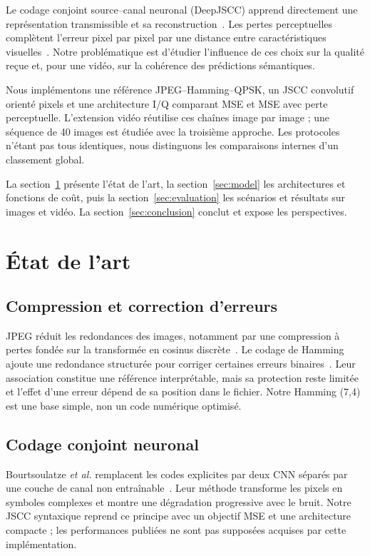 \documentclass[conference]{IEEEtran}
\begin{document}
Le codage conjoint source--canal neuronal (DeepJSCC) apprend directement
une représentation transmissible et sa reconstruction~\cite{deepjscc}.
Les pertes perceptuelles complètent l'erreur pixel par pixel par une
distance entre caractéristiques visuelles~\cite{perceptual}. Notre
problématique est d'étudier l'influence de ces choix sur la qualité
reçue et, pour une vidéo, sur la cohérence des prédictions sémantiques.

Nous implémentons une référence JPEG--Hamming--QPSK, un JSCC
convolutif orienté pixels et une architecture I/Q comparant MSE et
MSE avec perte perceptuelle. L'extension vidéo réutilise ces chaînes
image par image ; une séquence de 40 images est étudiée avec la
troisième approche. Les protocoles n'étant pas tous identiques,
nous distinguons les comparaisons internes d'un classement global.

La section~\ref{sec:related} présente l'état de l'art, la
section~\ref{sec:model} les architectures et fonctions de coût, puis
la section~\ref{sec:evaluation} les scénarios et résultats sur images
et vidéo. La section~\ref{sec:conclusion} conclut et expose les perspectives.

\section{État de l'art}
\label{sec:related}
\subsection{Compression et correction d'erreurs}
JPEG réduit les redondances des images, notamment par une compression
à pertes fondée sur la transformée en cosinus discrète~\cite{jpeg}.
Le codage de Hamming ajoute une redondance structurée pour corriger
certaines erreurs binaires~\cite{hamming}. Leur association constitue
une référence interprétable, mais sa protection reste limitée et
l'effet d'une erreur dépend de sa position dans le fichier. Notre
Hamming (7,4) est une base simple, non un code numérique optimisé.

\subsection{Codage conjoint neuronal}
Bourtsoulatze \textit{et al.} remplacent les codes explicites par deux
CNN séparés par une couche de canal non entraînable~\cite{deepjscc}.
Leur méthode transforme les pixels en symboles complexes et montre
une dégradation progressive avec le bruit. Notre JSCC syntaxique
reprend ce principe avec un objectif MSE et une architecture compacte ;
les performances publiées ne sont pas supposées acquises par cette
implémentation.
\end{document}
